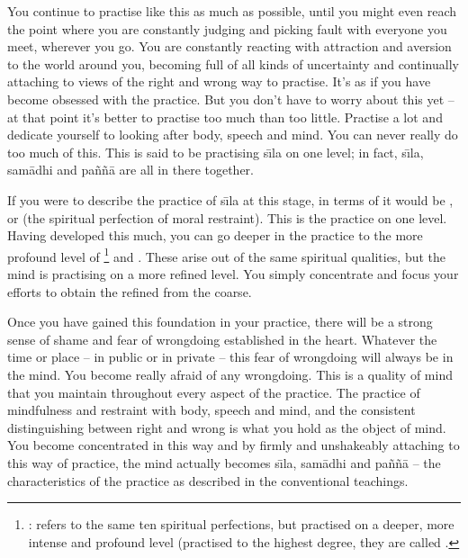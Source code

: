 You continue to practise like this as much as possible, until you might even reach the point where you are constantly judging and picking fault with everyone you meet, wherever you go. You are constantly reacting with attraction and aversion to the world around you, becoming full of all kinds of uncertainty and continually attaching to views of the right and wrong way to practise. It's as if you have become obsessed with the practice. But you don't have to worry about this yet -- at that point it's better to practise too much than too little. Practise a lot and dedicate yourself to looking after body, speech and mind. You can never really do too much of this. This is said to be practising s\={\i}la on one level; in fact, s\={\i}la, sam\=adhi and pa\~n\~n\=a are all in there together.

If you were to describe the practice of s\={\i}la at this stage, in terms of  it would be , or  (the spiritual perfection of moral restraint). This is the practice on one level. Having developed this much, you can go deeper in the practice to the more profound level of \footnote{: refers to the same ten spiritual perfections, but practised on a deeper, more intense and profound level (practised to the highest degree, they are called . } and . These arise out of the same spiritual qualities, but the mind is practising on a more refined level. You simply concentrate and focus your efforts to obtain the refined from the coarse.

Once you have gained this foundation in your practice, there will be a strong sense of shame and fear of wrongdoing established in the heart. Whatever the time or place -- in public or in private -- this fear of wrongdoing will always be in the mind. You become really afraid of any wrongdoing. This is a quality of mind that you maintain throughout every aspect of the practice. The practice of mindfulness and restraint with body, speech and mind, and the consistent distinguishing between right and wrong is what you hold as the object of mind. You become concentrated in this way and by firmly and unshakeably attaching to this way of practice, the mind actually becomes s\={\i}la, sam\=adhi and pa\~n\~n\=a -- the characteristics of the practice as described in the conventional teachings.

